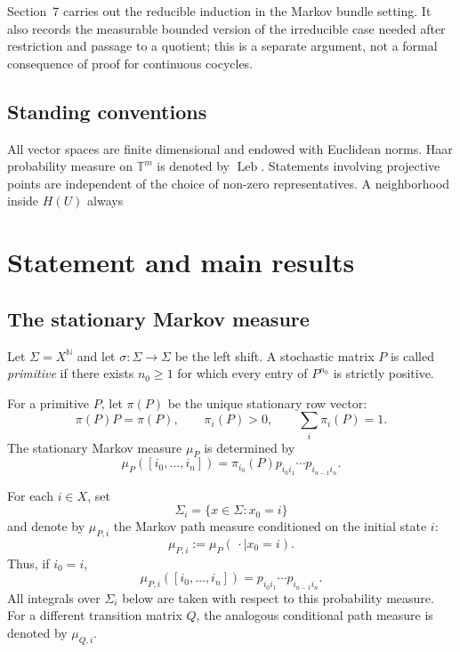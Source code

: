 \documentclass[11pt,a4paper]{amsart}
\newcommand{\T}{\mathbb T}
\newcommand{\N}{\mathbb N}
\newcommand{\Leb}{\operatorname{Leb}}
\begin{document}
Section~7 carries out
the reducible induction in the Markov bundle setting.  It also records
the measurable bounded version of the irreducible case needed after
restriction and passage to a quotient; this is a separate argument,
not a formal consequence of proof for continuous cocycles.

\subsection*{Standing conventions}

All vector spaces are finite dimensional and endowed with Euclidean
norms.  Haar probability measure on \(\T^m\) is denoted by \(\Leb\).
Statements involving projective points are independent of the choice
of non-zero representatives.  A neighborhood inside \(H(U)\) always


\section{Statement and main results}
\subsection{The stationary Markov measure}

Let \(\Sigma=X^\N\) and let \(\sigma:\Sigma\to\Sigma\) be the
left shift.  A stochastic matrix \(P\) is called \emph{primitive} if
there exists \(n_0\ge1\) for which every entry of \(P^{n_0}\) is
strictly positive.%

For a primitive \(P\), let \(\pi(P)\) be the unique stationary row
vector:
\[
 \pi(P)P=\pi(P),\qquad
 \pi_i(P)>0,\qquad
 \sum_i\pi_i(P)=1.
\]
The stationary Markov measure \(\mu_P\) is determined by
\[
 \mu_P([i_0,\dots,i_n])
 =\pi_{i_0}(P)p_{i_0i_1}\cdots p_{i_{n-1}i_n}.
\]

For each \(i\in X\), set
\[
 \Sigma_i=\{x\in\Sigma:x_0=i\}
\]
and denote by \(\mu_{P,i}\) the Markov path measure conditioned on
the initial state \(i\):
\[
 \mu_{P,i}:=\mu_P(\,\cdot\mid x_0=i).
\]
Thus, if \(i_0=i\),
\begin{equation}\label{eq:conditional-path-measure}
 \mu_{P,i}([i_0,\ldots,i_n])
 =
 p_{i_0i_1}\cdots p_{i_{n-1}i_n}.
\end{equation}
All integrals over \(\Sigma_i\) below are taken with respect to this
probability measure.  For a different transition matrix \(Q\), the
analogous conditional path measure is denoted by \(\mu_{Q,i}\).%
\end{document}
